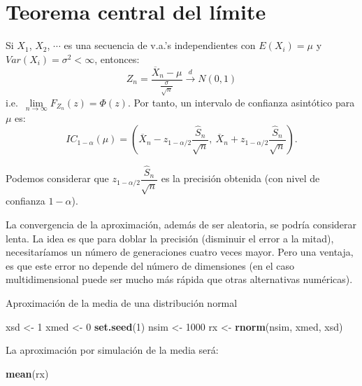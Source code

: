 \documentclass[
]{book}
\newenvironment{Shaded}{\begin{snugshade}}{\end{snugshade}}
\newcommand{\DecValTok}[1]{\textcolor[rgb]{0.00,0.00,0.81}{#1}}
\newcommand{\KeywordTok}[1]{\textcolor[rgb]{0.13,0.29,0.53}{\textbf{#1}}}
\newcommand{\NormalTok}[1]{#1}
\newcommand{\StringTok}[1]{\textcolor[rgb]{0.31,0.60,0.02}{#1}}
\theoremstyle{break}
\theoremstyle{definition}
\theoremstyle{definition}
\theoremstyle{definition}
\theoremstyle{remark}
\let\BeginKnitrBlock\begin \let\EndKnitrBlock\end
\begin{document}
\hypertarget{teorema-central-del-luxedmite}{%
\section{Teorema central del límite}\label{teorema-central-del-luxedmite}}

Si \(X_{1}\), \(X_{2}\), \(\cdots\) es una secuencia de v.a.'s
independientes con \(E\left( X_{i}\right) =\mu\) y
\(Var\left( X_{i}\right) = \sigma ^{2}<\infty\), entonces:
\[Z_{n}=\frac{\overline{X}_{n}-\mu }{\frac{\sigma }{\sqrt{n}}}
\overset{d}{ \rightarrow } N(0,1)\]
i.e.~\(\lim\limits_{n\rightarrow \infty }F_{Z_{n}}(z)=\Phi (z)\).
Por tanto, un intervalo de confianza asintótico para \(\mu\) es:
\[IC_{1-\alpha }(\mu ) = \left( \overline{X}_{n}
- z_{1-\alpha /2}\dfrac{\widehat{S}_{n}}{\sqrt{n}},\ 
\overline{X}_n+z_{1-\alpha /2}\dfrac{\widehat{S}_{n}}{\sqrt{n}} \right).\]

Podemos considerar que
\(z_{1-\alpha /2}\dfrac{\widehat{S}_{n}}{\sqrt{n}}\)
es la precisión obtenida (con nivel de confianza \(1-\alpha\)).

La convergencia de la aproximación, además de ser aleatoria, se podría considerar lenta.
La idea es que para doblar la precisión (disminuir el error a la mitad), necesitaríamos un número de generaciones cuatro veces mayor. Pero una ventaja, es que este error no depende del número de dimensiones (en el caso multidimensional puede ser mucho más rápida que otras alternativas numéricas).

\BeginKnitrBlock{example}
\protect\hypertarget{exm:unnamed-chunk-5}{}{\label{exm:unnamed-chunk-5} }Aproximación de la media de una distribución normal
\EndKnitrBlock{example}

\begin{Shaded}
\begin{Highlighting}[]
\NormalTok{xsd <-}\StringTok{ }\DecValTok{1}
\NormalTok{xmed <-}\StringTok{ }\DecValTok{0}
\KeywordTok{set.seed}\NormalTok{(}\DecValTok{1}\NormalTok{)}
\NormalTok{nsim <-}\StringTok{ }\DecValTok{1000}
\NormalTok{rx <-}\StringTok{ }\KeywordTok{rnorm}\NormalTok{(nsim, xmed, xsd)}
\end{Highlighting}
\end{Shaded}

La aproximación por simulación de la media será:

\begin{Shaded}
\begin{Highlighting}[]
\KeywordTok{mean}\NormalTok{(rx)}
\end{Highlighting}
\end{Shaded}
\end{document}
